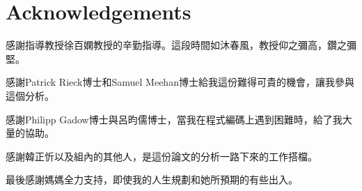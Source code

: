 \documentclass[class=NTHU_thesis, crop=false]{standalone}
\begin{document}
\chapter{Acknowledgements}
感謝指導教授徐百嫻教授的辛勤指導。這段時間如沐春風，教授仰之彌高，鑽之彌堅。
\newline

感謝Patrick Rieck博士和Samuel Meehan博士給我這份難得可貴的機會，讓我參與這個分析。
\newline

感謝Philipp Gadow博士與呂昀儒博士，當我在程式編碼上遇到困難時，給了我大量的協助。
\newline

感謝韓正忻以及組內的其他人，是這份論文的分析一路下來的工作搭檔。
\newline

最後感謝媽媽全力支持，即使我的人生規劃和她所預期的有些出入。
\end{document}
